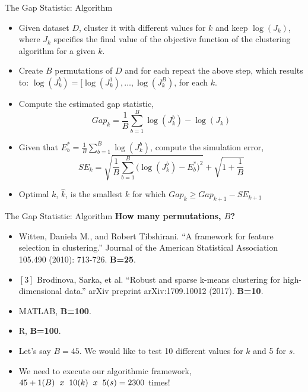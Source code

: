 \documentclass{beamer}
\newlength{\tmpShadow}
\newcommand{\MyShadow}[2]{%
	\settowidth{\tmpShadow}{#1}
	\addtolength{\tmpShadow}{.1em}
	\raisebox{-0.25ex}{\textcolor{gray!70}{#1}}%
	\kern-\tmpShadow%
	\textcolor{#2}{#1}%
}
\begin{document}
{\begin{frame}{The Gap Statistic: Algorithm}
	\begin{itemize}[label={\MyShadow{$\bullet$}{blue!80}}]
		\item Given dataset $D$, cluster it with different values for $k$ and keep $\log(J_k)$, where $J_k$ specifies the final value of the objective function of the clustering algorithm for a given $k$.
		\item Create $B$ permutations of $D$ and for each repeat the above step, which results to: $\log(J_k^b) = [\log(J_k^1),\dots,\log(J_k^B)$, for each $k$.
		\item Compute the estimated gap statistic, 
		\begin{equation}\nonumber
		Gap_k = \frac{1}{B}\sum_{b=1}^{B}\log(J_k^b) - \log(J_k)
		\end{equation}
		\item Given that $E_b^* = \frac{1}{B}\sum_{b=1}^{B}\log(J_k^b)$, compute the simulation error,
		\begin{equation}\nonumber
		SE_k = \sqrt{\frac{1}{B}\sum_{b=1}^{B}\bigg(\log(J_k^b)-E_b^*\bigg)^2} + \sqrt{1+\frac{1}{B}}
		\end{equation}		
		\item Optimal $k$, $\hat{k}$, is the smallest $k$ for which $Gap_k \geq Gap_{k+1}-SE_{k+1}$ 
	\end{itemize}
\end{frame}

\begin{frame}{The Gap Statistic: Algorithm}
	\textbf{How many permutations, $B$?}
	\begin{itemize}[label={\MyShadow{$\bullet$}{blue!80}}]
		\item<2-> Witten, Daniela M., and Robert Tibshirani. ``A framework for feature selection in clustering.'' Journal of the American Statistical Association 105.490 (2010): 713-726. \textbf{B=25}.
		\vspace{3mm}	
		\item<2-> $[3]$ Brodinova, Sarka, et al. ``Robust and sparse k-means clustering for high-dimensional data.'' arXiv preprint arXiv:1709.10012 (2017). \textbf{B=10}.
		\item<3-> MATLAB, \textbf{B=100}.
		\vspace{3mm}	
		\item<3-> R, \textbf{B=100}.
	\end{itemize}
	\begin{itemize}[label={\MyShadow{$\bullet$}{red!80}}]
		\item<4-> Let's say $B = 45$. We would like to test 10 different values for $k$ and 5 for $s$.
		\item<5-> We need to execute our algorithmic framework, $45+1(B) \hphantom{x} x \hphantom{x} 10(k) \hphantom{x} x \hphantom{x} 5(s) = 2300$ times!
	\end{itemize}
\end{frame}

}
\end{document}
